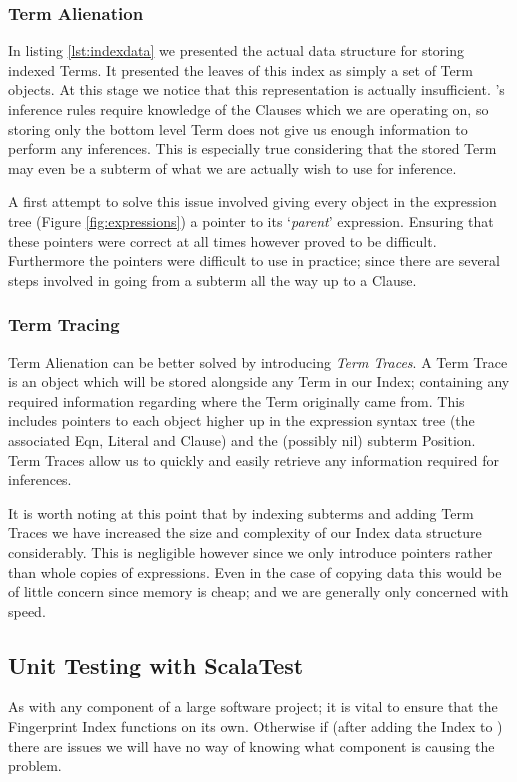 \subsubsection{Term Alienation}
In listing \ref{lst:indexdata} we presented the actual data structure for storing
indexed Terms. It presented the leaves of this index as simply a set of Term objects.
At this stage we notice that this representation is actually insufficient. \Beagle's
inference rules require knowledge of the Clauses which we are operating on, so
storing only the bottom level Term does not give us enough information to perform any
inferences. This is especially true considering that the stored Term may even
be a subterm of what we are actually wish to use for inference.

A first attempt to solve this issue involved giving every object in the expression
tree (Figure \ref{fig:expressions}) a pointer to its `\emph{parent}' expression.
Ensuring that these pointers were correct at all times however proved to be
difficult. Furthermore the pointers were difficult to use in practice; since there
are several steps involved in going from a subterm all the way up to a Clause.

\subsubsection{Term Tracing}

Term Alienation can be better solved by introducing \emph{Term Traces}. A Term Trace
is an object which will be stored alongside any Term in our Index; containing any
required information regarding where the Term originally came from. This includes
pointers to each object higher up in the expression syntax tree (the associated Eqn, Literal
and Clause) and the (possibly nil) subterm Position. Term Traces allow us to quickly
and easily retrieve any information required for inferences.
 
It is worth noting at this point that by indexing subterms and adding Term Traces we have
increased the size and complexity of our Index data structure considerably.
This is negligible however since we only introduce pointers rather than whole
copies of expressions. Even in the case of copying data this would be of little
concern since memory is cheap; and we are generally only concerned with speed.

\subsection{Unit Testing with ScalaTest}
\label{sec:unittest}

As with any component of a large software project; it is vital to ensure that the
Fingerprint Index functions on its own. Otherwise if (after adding the Index to
\beagle) there are issues we will have no way of knowing what component is
causing the problem. 

